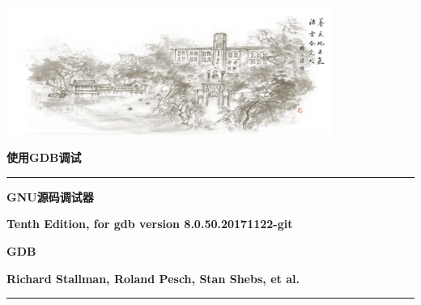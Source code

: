 \documentclass[class=book, crop=false]{standalone}
\begin{document}
\begin{CJK}{UTF8}{gbsn}
\begin{titlepage}
\centering
\includegraphics[width=0.8\textwidth]{title} \vspace{1cm}
\par

\begingroup
\fontsize{68pt}{22pt}\selectfont
\vspace{2ex}
\centering
{\fontsize{20}{15}\bfseries\scshape 使用GDB调试} \par
\rule{\textwidth}{1mm}

\vspace{1ex}
\raggedleft
{\bfseries\small GNU源码调试器\hspace{2em}} \par
{\bfseries\small Tenth Edition, for gdb version 8.0.50.20171122-git \hspace{2em}} \par
{\bfseries\small GDB \hspace{2em}} \par


\fontsize{68pt}{200pt}\selectfont
\vspace{2ex}
\centering
\raggedright
{\bfseries\small Richard Stallman, Roland Pesch, Stan Shebs, et al.\hspace{2em}} \par
\rule{\textwidth}{1mm}
\endgroup

 \par
{} \par
\end{titlepage}


\end{CJK}
\end{document}
